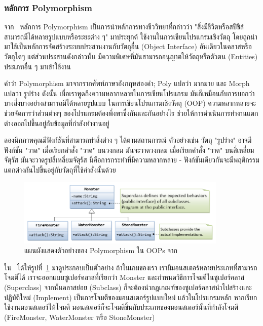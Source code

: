 \documentclass[12pt,one side,openright,a4paper]{cpe-thesis-th}
\newcommand{\thaijustify}[1]{%
  \par\hspace{30pt}\justifying
  #1
}
\begin{document}
\subsubsection{หลักการ Polymorphism}
\thaijustify{
  จาก~\cite{javapolymorph} หลักการ Polymorphism เป็นการนำหลักการทางชีววิทยาที่กล่าวว่า "สิ่งมีชีวิตหรือสปีชีส์สามารถมีได้หลายรูปแบบหรือระยะต่าง ๆ" มาประยุกต์ ใช้งานในการเขียนโปรแกรมเชิงวัตถุ โดยถูกนำมาใช้เป็นหลักการจัดสร้างระบบประสานงานกับวัตถุอื่น (Object Interface) อันเดียวในคลาสหรือวัตถุใดๆ แต่ส่วนประสานดังกล่าวนั้น มีความพิเศษที่มันสามารถอนุญาตให้วัตถุหรือตัวตน (Entities) ประเภทอื่น ๆ มาเข้าใช้งาน
}
\thaijustify{
  คำว่า Polymorphism มาจากรากศัพท์ภาษาอังกฤษสองคำ; Poly แปลว่า มากมาย และ Morph แปลว่า รูปร่าง ดังนั้น เมื่อเราพูดถึงความหลากหลายในการเขียนโปรแกรม มันก็เหมือนกับการบอกว่าบางสิ่งบางอย่างสามารถมีได้หลายรูปแบบ ในการเขียนโปรแกรมเชิงวัตถุ (OOP) ความหลากหลายจะช่วยจัดการว่าส่วนต่างๆ ของโปรแกรมต้องพึ่งพาซึ่งกันและกันอย่างไร ช่วยให้การดำเนินการทำงานแตกต่างออกไปขึ้นอยู่กับข้อมูลที่กำลังทำงานอยู่~\cite{nzeruekenneth23polymorph}
}
\thaijustify{
  ลองนึกภาพคุณมีฟังก์ชันที่สามารถทำสิ่งต่าง ๆ ได้ตามสถานการณ์ ตัวอย่างเช่น วัตถุ "รูปร่าง" อาจมีฟังก์ชัน "วาด" เมื่อเรียกคำสั่ง "วาด" บนวงกลม มันจะวาดวงกลม เมื่อเรียกคำสั่ง "วาด" บนสี่เหลี่ยมจัตุรัส มันจะวาดรูปสี่เหลี่ยมจัตุรัส นี่คือการกระทำที่มีความหลากหลาย - ฟังก์ชันเดียวกันจะมีพฤติกรรมแตกต่างกันไปขึ้นอยู่กับวัตถุที่ใช้คำสั่งนั้นด้วย~\cite{ntu20polymorph}
}
\begin{figure}[H]
  \centering
  \includegraphics[width=10cm]{figure/literature/oop-polymorphism.png}
  \caption[แผนผังแสดงตัวอย่างของ Polymorphism ใน OOPs]{แผนผังแสดงตัวอย่างของ Polymorphism ใน OOPs จาก~\cite{ntu20polymorph}}
  \label{fig:oop-polymorph}
\end{figure}
\thaijustify{
  ใน~\cite{ntu20polymorph} ได้ให้รูปที่~\ref{fig:oop-polymorph} มาดูประกอบเป็นตัวอย่าง ถ้าในเกมของเรา เรามีมอนสเตอร์หลายประเภทที่สามารถโจมตีได้ เราจะออกแบบซูเปอร์คลาสที่เรียกว่า Monster และกำหนดวิธีการโจมตีในซูเปอร์คลาส (Superclass) จากนั้นคลาสย่อย (Subclass) ก็จะต้องนำกฎเกณฑ์ของซูเปอร์คลาสนำไปสร้างและปฏิบัติใหม่ (Implement) เป็นการโจมตีของมอนสเตอร์รูปแบบใหม่  แล้วในโปรแกรมหลัก หากเรียกใช้งานมอนสเตอร์ให้โจมตี มอนสเตอร์ก็จะโจมตีขึ้นกับประเภทของมอนสเตอร์นั้นที่กำลังโจมตี (FireMonster, WaterMonster หรือ StoneMonster)
}
\end{document}
